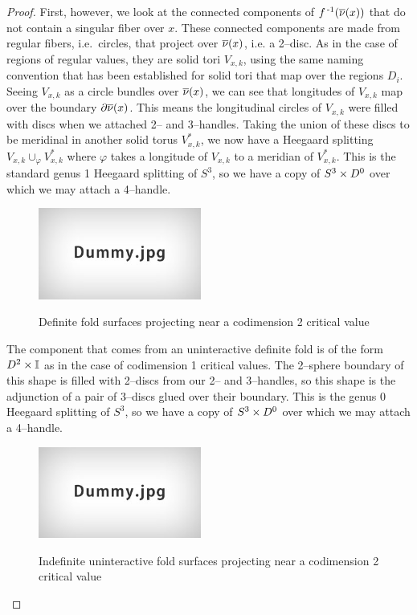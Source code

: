 \begin{proof}
	First, however, we look at the connected components of $f^{\,\text{-}1}(\overline{\nu}(x))$ that do not contain a singular fiber over $x$.
	These connected components are made from regular fibers, i.e.\ circles, that project over $\overline{\nu}(x)$, i.e. a 2--disc.
	As in the case of regions of regular values, they are solid tori $V_{x,k}$, using the same naming convention that has been established for solid tori that map over the regions $D_i$.
	Seeing $V_{x,k}$ as a circle bundles over $\overline{\nu}(x)$, we can see that longitudes of $V_{x,k}$ map over the boundary $\partial\overline{\nu}(x)$.
	This means the longitudinal circles of $V_{x,k}$ were filled with discs when we attached 2-- and 3--handles.
	Taking the union of these discs to be meridinal in another solid torus $V_{x,k}^*$, we now have a Heegaard splitting $V_{x,k}\cup_\varphi V_{x,k}^*$ where $\varphi$ takes a longitude of $V_{x,k}$ to a meridian of $V_{x,k}^*$.
	This is the standard genus 1 Heegaard splitting of $S^3$, so we have a copy of $S^3\times D^0$ over which we may attach a 4--handle.

	\begin{figure}
		\centering
		\captionsetup{justification=centering}
		\caption{Definite fold surfaces projecting near a codimension 2 critical value}
		\includegraphics[height=3cm]{figures/dummy.jpg}
		\label{fig:deffoldprojcodim2}
	\end{figure}

	The component that comes from an uninteractive definite fold is of the form $D^2\times\mathbb{I}$ as in the case of codimension 1 critical values.
	The 2--sphere boundary of this shape is filled with 2--discs from our 2-- and 3--handles, so this shape is the adjunction of a pair of 3--discs glued over their boundary.
	This is the genus 0 Heegaard splitting of $S^3$, so we have a copy of $S^3\times D^0$ over which we may attach a 4--handle.
	
	\begin{figure}
		\centering
		\captionsetup{justification=centering}
		\caption{Indefinite uninteractive fold surfaces projecting near a codimension 2 critical value}
		\includegraphics[height=3cm]{figures/dummy.jpg}
		\label{fig:indeffoldprojcodim2}
	\end{figure}
	

\end{proof}
